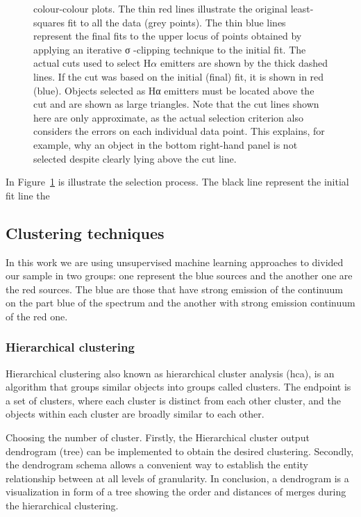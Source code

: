 \documentclass[fleqn,usenatbib]{mnras}
\begin{document}
\begin{figure}
{    colour-colour plots. The thin red lines illustrate the original least-squares
    fit to all the data (grey points). The thin blue lines represent the final
    fits to the upper locus of points obtained by applying an iterative
    σ -clipping technique to the initial fit. The actual cuts used to select H{$\alpha$}
    emitters are shown by the thick dashed lines. If the cut was based on the initial (final)
    fit, it is shown in red (blue). Objects selected as Hα emitters must be located above
    the cut and are shown as large triangles. Note that the cut lines shown here
    are only approximate, as the actual selection criterion also considers the errors on
    each individual data point. This explains, for example, why an object in the bottom
    right-hand panel is not selected despite clearly lying above the cut line.}
  \label{fig:criteria-color-plot}
\end{figure}

In Figure~\ref{fig:criteria-color-plot} is illustrate the selection process.
The black line represent the initial fit line the  


\subsection{Clustering techniques}
\label{sec:clustering}

In this work we are using unsupervised machine learning approaches to divided our sample
in two groups: one represent the blue sources and the another one are the red sources. The blue
are those that have strong emission of the continuum on the part blue of the spectrum and
the another with strong emission continuum of the red one. 

\subsubsection{Hierarchical clustering}
\label{sec:Hierar}

Hierarchical clustering also known as hierarchical cluster analysis ({\sc hca}),
is an algorithm that groups similar objects into groups called clusters.
The endpoint is a set of clusters, where each cluster is distinct from each
other cluster, and the objects within each cluster are broadly similar to each other.

Choosing the number of cluster. Firstly, the Hierarchical cluster output dendrogram (tree)
can be implemented to obtain the desired clustering. Secondly, the dendrogram schema  allows
a convenient way to establish the entity relationship between at all levels of granularity.
In conclusion, a dendrogram is a visualization in form of a tree showing the order
and distances of merges during the hierarchical clustering.
\end{document}
